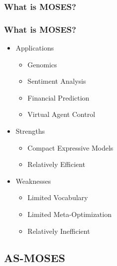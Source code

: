 \documentclass[aspectratio=169]{beamer}
\begin{document}
\begin{frame}
  \frametitle{What is MOSES?}


\end{frame}
  
\begin{frame}
  \frametitle{What is MOSES?}

  \begin{itemize}
  \item<+-> Applications
    \begin{itemize}
    \item Genomics
    \item Sentiment Analysis
    \item Financial Prediction
    \item Virtual Agent Control
    \end{itemize}
  \item<+-> Strengths
    \begin{itemize}
    \item \alert{Compact Expressive Models}
    \item Relatively Efficient
    \end{itemize}
  \item<+-> Weaknesses
    \begin{itemize}
    \item Limited Vocabulary
    \item Limited Meta-Optimization
    \item Relatively Inefficient
    \end{itemize}
  \end{itemize}

\end{frame}

\subsection{AS-MOSES}
\end{document}

